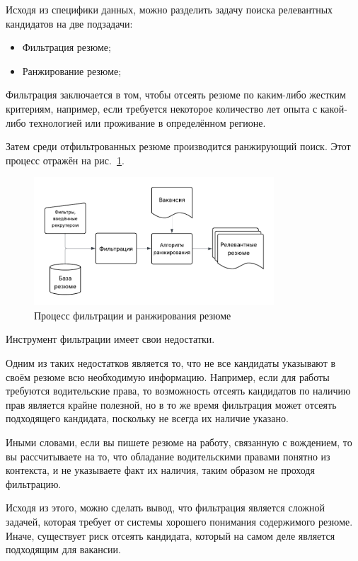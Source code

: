 \documentclass[14pt]{mmcs_article}
\begin{document}
Исходя из специфики данных, можно разделить задачу поиска релевантных кандидатов на две подзадачи:

\begin{itemize}
  \item Фильтрация резюме;
  \item Ранжирование резюме;
\end{itemize}

Фильтрация заключается в том, чтобы отсеять резюме по каким-либо жестким критериям, например, если требуется некоторое количество лет опыта с какой-либо технологией или проживание в определённом регионе.

Затем среди отфильтрованных резюме производится ранжирующий поиск. Этот процесс отражён на рис.~\ref{fig:filtering_and_ranking}.

\begin{figure}[h]
  \centering
  \includegraphics[width=0.8\textwidth]{plots/filtering_and_ranking.pdf}
  \caption{\centering Процесс фильтрации и ранжирования резюме}
  \label{fig:filtering_and_ranking}
\end{figure}

Инструмент фильтрации имеет свои недостатки.

Одним из таких недостатков является то, что не все кандидаты указывают в своём резюме всю необходимую информацию. Например, если для работы требуются водительские права, то возможность отсеять кандидатов по наличию прав является крайне полезной, но в то же время фильтрация может отсеять подходящего кандидата, поскольку не всегда их наличие указано.

Иными словами, если вы пишете резюме на работу, связанную с вождением, то вы рассчитываете на то, что обладание водительскими правами понятно из контекста, и не указываете факт их наличия, таким образом не проходя фильтрацию.

Исходя из этого, можно сделать вывод, что фильтрация является сложной задачей, которая требует от системы хорошего понимания содержимого резюме. Иначе, существует риск отсеять кандидата, который на самом деле является подходящим для вакансии.
\end{document}
